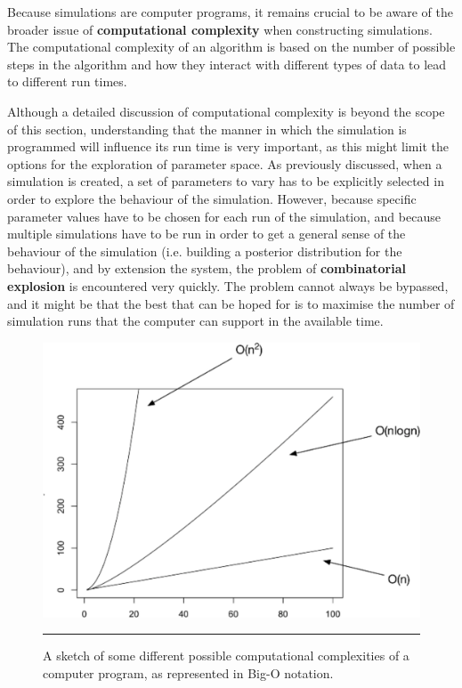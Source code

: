 Because simulations are computer programs, it remains crucial  to be aware of the broader issue of \textbf{computational complexity} when constructing simulations. The computational complexity of an algorithm is based on the number of possible steps in the algorithm and how they interact with different types of data to lead to different run times. \par Although a detailed discussion of computational complexity is beyond the scope of this section, understanding that the manner in which the simulation is programmed will influence its run time is very important, as this  might limit the options for the exploration of parameter space.\newpage\noindent
As previously discussed, when a simulation is created, a set of parameters to vary has to be explicitly selected in order to explore the behaviour of the simulation. However, because specific parameter values have to be chosen for each run of the simulation, and because multiple simulations have to be run in order to get a general sense of the behaviour of the simulation (i.e. building a posterior distribution for the behaviour), and by extension the system, the problem of \textbf{combinatorial explosion} is encountered  very quickly. The problem cannot always be bypassed, and it might be that the best that can be hoped for is to maximise the number of simulation runs that the computer can support in the available time.

\begin{figure}[!t]
	\centering
		\includegraphics[width=\textwidth]{images/SIM/program_complexity.png}
	\caption[\small A sketch of computational complexity]{\small A sketch of some different possible computational complexities of a computer program, as represented in Big-O notation.}
	\label{simfig:10}\hrule
\end{figure}
\afterpage{\FloatBarrier}
